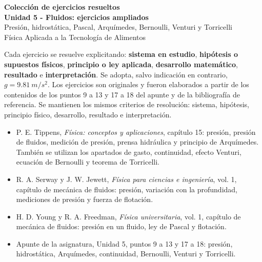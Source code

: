 \documentclass[11pt,a4paper]{article}
\begin{document}
\begin{center}
{\Large\bfseries Colección de ejercicios resueltos}\\[3pt]
{\LARGE\bfseries Unidad 5 - Fluidos: ejercicios ampliados}\\[6pt]
{\large Presión, hidrostática, Pascal, Arquímedes, Bernoulli, Venturi y Torricelli}\\[8pt]
Física Aplicada a la Tecnología de Alimentos
\end{center}
\vspace{4mm}

\begin{tcolorbox}[colback=white,colframe=utnblue,title=Criterio de resolución,fonttitle=\bfseries]
Cada ejercicio se resuelve explicitando: \textbf{sistema en estudio}, \textbf{hipótesis o supuestos físicos}, \textbf{principio o ley aplicada}, \textbf{desarrollo matemático}, \textbf{resultado} e \textbf{interpretación}. Se adopta, salvo indicación en contrario, $g=\SI{9.81}{m/s^2}$. Los ejercicios son originales y fueron elaborados a partir de los contenidos de los puntos 9 a 13 y 17 a 18 del apunte y de la bibliografía de referencia. Se mantienen los mismos criterios de resolución: sistema, hipótesis, principio físico, desarrollo, resultado e interpretación.
\end{tcolorbox}

\begin{tcolorbox}[colback=lightblue,colframe=blue!60!black,title=Base bibliográfica,fonttitle=\bfseries]
\begin{itemize}
\item P. E. Tippens, \emph{Física: conceptos y aplicaciones}, capítulo 15: presión, presión de fluidos, medición de presión, prensa hidráulica y principio de Arquímedes. También se utilizan los apartados de gasto, continuidad, efecto Venturi, ecuación de Bernoulli y teorema de Torricelli.
\item R. A. Serway y J. W. Jewett, \emph{Física para ciencias e ingeniería}, vol. 1, capítulo de mecánica de fluidos: presión, variación con la profundidad, mediciones de presión y fuerza de flotación.
\item H. D. Young y R. A. Freedman, \emph{Física universitaria}, vol. 1, capítulo de mecánica de fluidos: presión en un fluido, ley de Pascal y flotación.
\item Apunte de la asignatura, Unidad 5, puntos 9 a 13 y 17 a 18: presión, hidrostática, Arquímedes, continuidad, Bernoulli, Venturi y Torricelli.
\end{itemize}
\end{tcolorbox}
\end{document}
